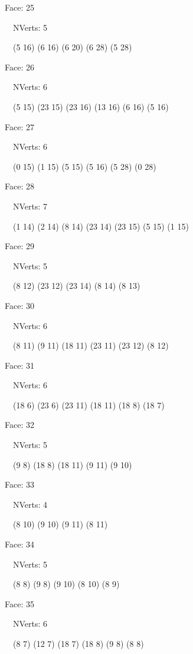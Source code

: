\documentclass{article}
\begin{document}
{\footnotesize 

Face: 25

\   \    NVerts: 5

 \   \   (5 16) (6 16) (6 20) (6 28) (5 28)}

{\footnotesize 

Face: 26

\   \    NVerts: 6

 \   \   (5 15) (23 15) (23 16) (13 16) (6 16) (5 16)}

{\footnotesize 

Face: 27

\   \    NVerts: 6

 \   \   (0 15) (1 15) (5 15) (5 16) (5 28) (0 28)}

{\footnotesize 

Face: 28

\   \    NVerts: 7

 \   \   (1 14) (2 14) (8 14) (23 14) (23 15) (5 15) (1 15)}

{\footnotesize 

Face: 29

\   \    NVerts: 5

 \   \   (8 12) (23 12) (23 14) (8 14) (8 13)}

{\footnotesize 

Face: 30

\   \    NVerts: 6

 \   \   (8 11) (9 11) (18 11) (23 11) (23 12) (8 12)}

{\footnotesize 

Face: 31

\   \    NVerts: 6

 \   \   (18 6) (23 6) (23 11) (18 11) (18 8) (18 7)}

{\footnotesize 

Face: 32

\   \    NVerts: 5

 \   \   (9 8) (18 8) (18 11) (9 11) (9 10)}

{\footnotesize 

Face: 33

\   \    NVerts: 4

 \   \   (8 10) (9 10) (9 11) (8 11)}

{\footnotesize 

Face: 34

\   \    NVerts: 5

 \   \   (8 8) (9 8) (9 10) (8 10) (8 9)}

{\footnotesize 

Face: 35

\   \    NVerts: 6

 \   \   (8 7) (12 7) (18 7) (18 8) (9 8) (8 8)}
\end{document}
